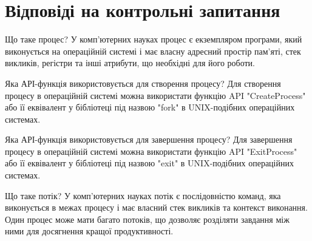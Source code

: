 \documentclass[a4paper, 12pt, oneside]{extarticle}
\begin{document}
\section*{Відповіді на контрольні запитання}
\begin{itemize}
	\question Що таке процес?
	\answer У комп'ютерних науках процес є екземпляром програми, який виконується на операційній системі і має власну адресний простір пам'яті, стек викликів, регістри та інші атрибути, що необхідні для його роботи.

	\question Яка АРІ-функція використовується для створення процесу?
	\answer Для створення процесу в операційній системі можна використати функцію API "CreateProcess" або її еквівалент у бібліотеці під назвою "fork" в UNIX-подібних операційних системах.

	\question Яка АРІ-функція використовується для завершення процесу?
	\answer Для завершення процесу в операційній системі можна використати функцію API "ExitProcess" або її еквівалент у бібліотеці під назвою "exit" в UNIX-подібних операційних системах.

	\question Що таке потік?
	\answer У комп'ютерних науках потік є послідовністю команд, яка виконується в межах процесу і має власний стек викликів та контекст виконання. Один процес може мати багато потоків, що дозволяє розділяти завдання між ними для досягнення кращої продуктивності.


\end{itemize}
\end{document}
